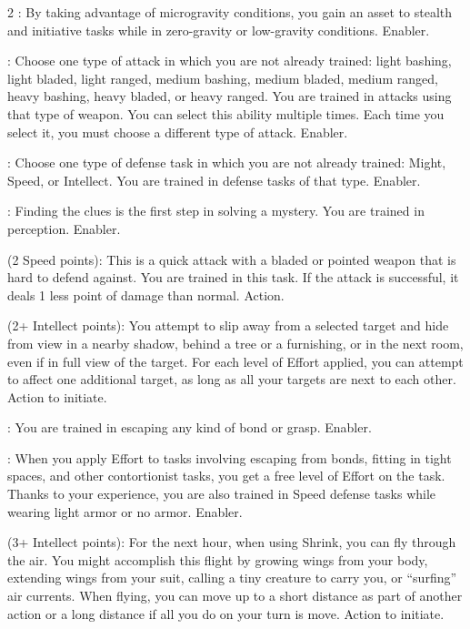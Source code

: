 \begin{multicols}{2}
: By taking advantage of microgravity conditions, you gain an asset to stealth and initiative tasks while in zero-gravity or low-gravity conditions. Enabler. 
 
: Choose one type of attack in which you are not already trained: light bashing, light bladed, light ranged, medium bashing, medium bladed, medium ranged, heavy bashing, heavy bladed, or heavy ranged. You are trained in attacks using that type of weapon. You can select this ability multiple times. Each time you select it, you must choose a different type of attack. Enabler.
 
: Choose one type of defense task in which you are not already trained: Might, Speed, or Intellect. You are trained in defense tasks of that type. Enabler. 
 
: Finding the clues is the first step in solving a mystery. You are trained in perception. Enabler. 
 
 (2 Speed points): This is a quick attack with a bladed or pointed weapon that is hard to defend against. You are trained in this task. If the attack is successful, it deals 1 less point of damage than normal. Action. 
 
 (2+ Intellect points): You attempt to slip away from a selected target and hide from view in a nearby shadow, behind a tree or a furnishing, or in the next room, even if in full view of the target. For each level of Effort applied, you can attempt to affect one additional target, as long as all your targets are next to each other. Action to initiate. 
 
: You are trained in escaping any kind of bond or grasp. Enabler. 
 
: When you apply Effort to tasks involving escaping from bonds, fitting in tight spaces, and other contortionist tasks, you get a free level of Effort on the task. Thanks to your experience, you are also trained in Speed defense tasks while wearing light armor or no armor. Enabler.
 
 (3+ Intellect points): For the next hour, when using Shrink, you can fly through the air. You might accomplish this flight by growing wings from your body, extending wings from your suit, calling a tiny creature to carry you, or “surfing” air currents. When flying, you can move up to a short distance as part of another action or a long distance if all you do on your turn is move. Action to initiate.


\end{multicols}
